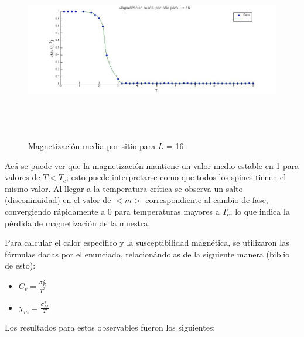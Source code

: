 \documentclass[a4paper,12pt]{article}
\begin{document}
\begin{figure}[H]
\begin{center}
\includegraphics[height=8cm]{../graficos/Mmean_L16.jpg}
\caption[width=5cm]{Magnetizaci\'on media por sitio para $L$ = 16.}
\end{center}
\end{figure}

Ac\'a se puede ver que la magnetizaci\'on mantiene un valor medio estable en 1 para valores de $T < T_{c}$; esto puede interpretarse como que todos los spines tienen el mismo valor. Al llegar a la temperatura cr\'itica se observa un salto (disconinuidad) en el valor de $<m>$ correspondiente al cambio de fase, convergiendo r\'apidamente a 0 para temperaturas mayores a $T_{c}$, lo que indica la p\'erdida de magnetizaci\'on de la muestra.


Para calcular el calor espec\'ifico y la susceptibilidad magn\'etica, se utilizaron las f\'ormulas dadas por el enunciado, relacion\'andolas de la siguiente manera (biblio de esto):

\begin{itemize}
\item $C_{v} = \frac{\sigma_{E}^{2}}{T^2}$ 
\item $\chi_{m} = \frac{\sigma_{M}^{2}}{T}$ 
\end{itemize}

Los resultados para estos observables fueron los siguientes:
\end{document}

